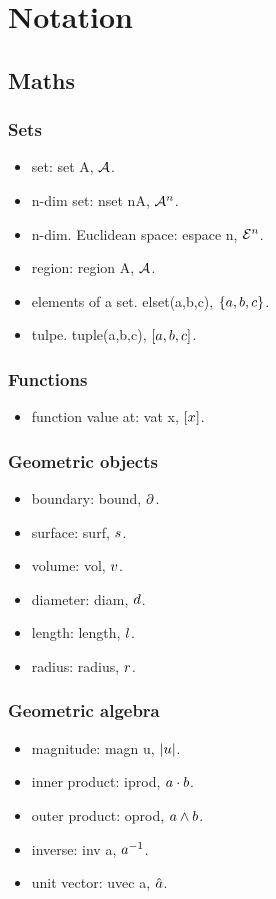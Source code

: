 \section{Notation}

\subsection{Maths}

\subsubsection{Sets}
\begin{itemize}
\item set: set A, $\set A$.
\item n-dim set: nset nA, $\nset nA$.
\item n-dim. Euclidean space: espace n, $\espace n$.
\item region: region A, $\region A$.
\item elements of a set. elset(a,b,c), $\elset{a,b,c}$.
\item tulpe. tuple(a,b,c), $\tuple{a,b,c}$.
\end{itemize}


\subsubsection{Functions}
\begin{itemize}
\item function value at: vat x, $\vat x$.
\end{itemize}


\subsubsection{Geometric objects}
\begin{itemize}
\item boundary: bound, $\bound$.
\item surface: surf, $\surf$.
\item volume: vol, $\vol$.
\item diameter: diam, $\diam$.
\item length: length, $\length$.
\item radius: radius, $\radius$.
\end{itemize}


\subsubsection{Geometric algebra}
\begin{itemize}
\item magnitude: magn u, $\magn u$.
\item inner product: iprod, $a\iprod b$.
\item outer product: oprod, $a\oprod b$.
\item inverse: inv a, $\inv a$.
\item unit vector: uvec a, $\uvec a$.
\end{itemize}


